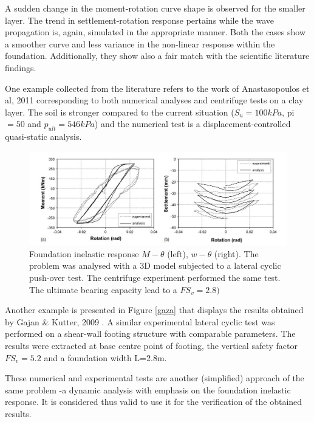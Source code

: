 A sudden change in the moment-rotation curve shape is observed for the smaller layer. The trend in settlement-rotation response pertains while the wave propagation is, again, simulated in the appropriate manner. Both the cases show a smoother curve and less variance in the non-linear response within the foundation. Additionally, they show also a fair match with the scientific literature findings.

One example collected from the literature refers to the work of Anastasopoulos et al, 2011 \cite{anastasopoulos2011simplified} corresponding to both numerical analyses and centrifuge tests on a clay layer. The soil is stronger compared to the current situation ($S_u=100kPa$, \gls{pi}$=50$ and $p_{ult}=546kPa$)  and the numerical test is a displacement-controlled quasi-static analysis. 

\begin{figure}[!h]
	\centering
	\includegraphics[width=0.8 \linewidth]{"example4"}
	\caption{Foundation inelastic response $M-\theta$ (left), $w-\theta$ (right). The problem was analysed with a 3D model subjected to a lateral cyclic push-over test.  The centrifuge experiment performed the same test. The ultimate bearing capacity lead to a  $FS_v=2.8)$}
	\label{gazii}
\end{figure}

Another example is presented in Figure \ref{gaza} that displays the results obtained by Gajan \& Kutter, 2009 \cite{gajan2009effects}. A similar experimental lateral cyclic test was performed on a shear-wall footing structure with comparable parameters. The results were extracted at base centre point of footing, the vertical safety factor $FS_v=5.2$ and a foundation width L=2.8m.

These numerical and experimental tests are another (simplified) approach of the same problem -a dynamic analysis with emphasis on the foundation inelastic response. It is considered thus valid to use it for the verification of the obtained results.
 
